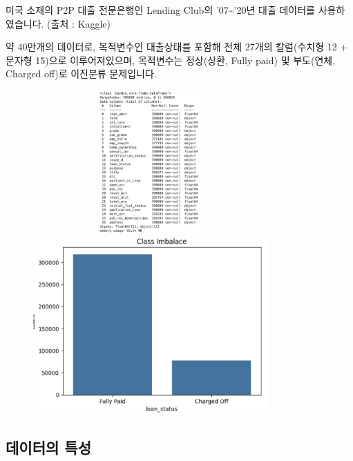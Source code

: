 \documentclass[
  a4paper,
  DIV=11,
  numbers=noendperiod]{scrreprt}
\begin{document}
미국 소재의 P2P 대출 전문은행인 Lending Club의 '07\textasciitilde'20년
대출 데이터를 사용하였습니다. (출처 : Kaggle)

약 40만개의 데이터로, 목적변수인 대출상태를 포함해 전체 27개의
칼럼(수치형 12 + 문자형 15)으로 이루어져있으며, 목적변수는 정상(상환,
Fully paid) 및 부도(연체, Charged off)로 이진분류 문제입니다.

\begin{figure}

\begin{minipage}{0.50\linewidth}
\begin{center}
\includegraphics[width=9cm,height=5.5cm]{image/ml1_datainfo.png}
\end{center}
\end{minipage}%
%
\begin{minipage}{0.50\linewidth}
\begin{center}
\includegraphics[width=0.8\textwidth,height=\textheight]{image/ml2_classimbal.png}
\end{center}
\end{minipage}%

\end{figure}%

\subsection*{데이터의 특성}\label{uxb370uxc774uxd130uxc758-uxd2b9uxc131}
\end{document}
